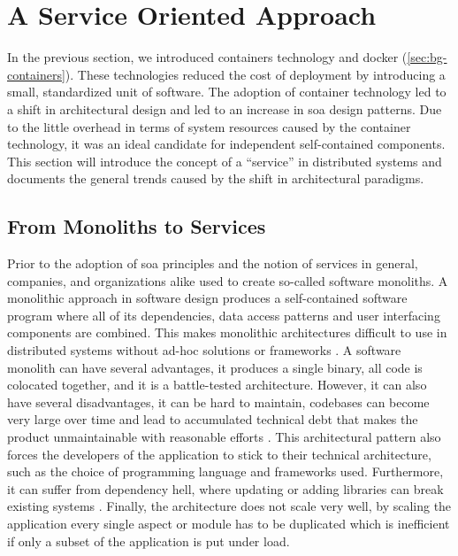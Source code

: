 \section{A Service Oriented Approach}
\label{sec:bg-microservices}

In the previous section, we introduced \glspl{container} technology and \Gls{docker} (\cref{sec:bg-containers}). These technologies reduced the cost of deployment by introducing a small, standardized unit of software. The adoption of container technology led to a shift in architectural design and led to an increase in \gls{soa} design patterns. Due to the little overhead in terms of system resources caused by the \gls{container} technology, it was an ideal candidate for independent self-contained components. This section will introduce the concept of a “service” in distributed systems and documents the general trends caused by the shift in architectural paradigms.

\subsection{From Monoliths to Services}
Prior to the adoption of \gls{soa} principles and the notion of services in general, companies, and organizations alike used to create so-called software \glspl{monolith}. A monolithic approach in software design produces a self-contained software program where all of its dependencies, data access patterns and user interfacing components are combined. This makes monolithic architectures difficult to use in distributed systems without ad-hoc solutions or frameworks \cite{dragoni2017microservices}. A software \gls{monolith} can have several advantages, it produces a single binary, all code is colocated together,  and it is a battle-tested architecture. However, it can also have several disadvantages, it can be hard to maintain, codebases can become very large over time and lead to accumulated technical debt that makes the product unmaintainable with reasonable efforts \cite{fritzsch2018monolith}. This architectural pattern also forces the developers of the application to stick to their technical architecture, such as the choice of programming language and frameworks used. Furthermore, it can suffer from dependency hell, where updating or adding libraries can break existing systems  \cite{merkel2014docker}. Finally, the architecture does not scale very well, by scaling the application every single aspect or module has to be duplicated which is inefficient if only a subset of the application is put under load.



